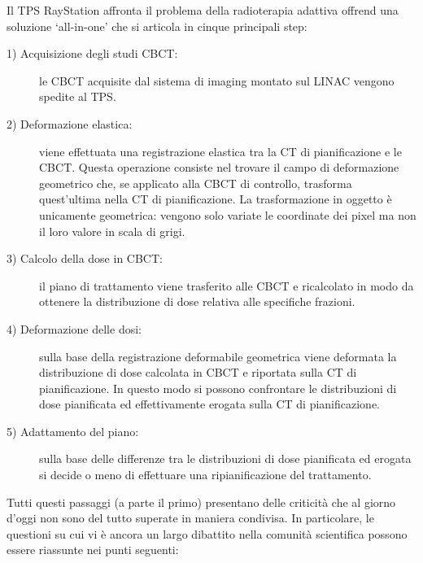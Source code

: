 Il TPS RayStation affronta il problema della radioterapia adattiva offrend una soluzione `all-in-one' che si articola in cinque principali step:
\begin{description}
\item[1) Acquisizione degli studi CBCT:] le CBCT acquisite dal sistema di imaging montato sul LINAC vengono spedite al TPS.
\item[2) Deformazione elastica:] viene effettuata una registrazione elastica tra la CT di pianificazione e le CBCT. Questa operazione consiste nel trovare il campo di deformazione geometrico che, se applicato alla CBCT di controllo,   trasforma quest'ultima nella CT di pianificazione. La trasformazione in oggetto è unicamente geometrica: vengono solo variate le coordinate dei pixel ma non il loro valore in scala di grigi.
\item[3) Calcolo della dose in CBCT:] il piano di trattamento viene trasferito alle CBCT e ricalcolato in modo da ottenere la distribuzione di dose relativa alle specifiche frazioni. 
\item[4) Deformazione delle dosi:] sulla base della registrazione deformabile geometrica viene deformata la distribuzione di dose calcolata in CBCT e riportata sulla CT di pianificazione. In questo modo si possono confrontare le distribuzioni di dose pianificata ed effettivamente erogata sulla CT di pianificazione.
\item[5) Adattamento del piano:] sulla base delle differenze tra le distribuzioni di dose pianificata ed erogata si decide o meno di effettuare una ripianificazione del trattamento.
\end{description}

Tutti questi passaggi (a parte il primo) presentano delle criticità che al giorno d'oggi non sono del tutto superate in maniera condivisa. In particolare, le questioni su cui vi è ancora un largo dibattito nella comunità scientifica possono essere riassunte nei punti seguenti:\\

